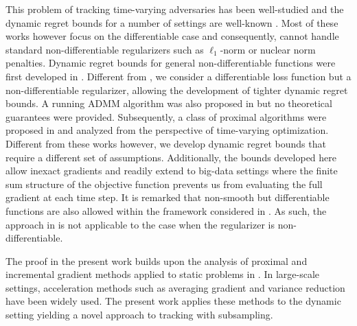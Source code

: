 \documentclass[draftcls,onecolumn,12pt]{IEEEtran}
\theoremstyle{plain}
\theoremstyle{plain}
\theoremstyle{remark}
\begin{document}
This problem of tracking time-varying adversaries has been well-studied and the dynamic regret bounds for a number of settings are well-known \cite{hall2015online, zhang2016improved, simonetto2015non, shahrampour2018distributed,pmlr-v38-jadbabaie15, bedi2018tracking}. Most of these works however focus on the differentiable case and consequently, cannot handle standard non-differentiable regularizers such as  $\ell_1$-norm or nuclear norm penalties. Dynamic regret bounds for general non-differentiable functions were first developed in \cite{hall2015online}. Different from \cite{hall2015online}, we consider a differentiable loss function but a non-differentiable regularizer, allowing the development of tighter dynamic regret bounds. A running ADMM algorithm was also proposed in \cite{simonetto2015non} but no theoretical guarantees were provided. Subsequently, a class of proximal algorithms were proposed in \cite{simonetto2017time, bernstein2018asynchronous} and analyzed from the perspective of time-varying optimization. Different from these works however, we develop dynamic regret bounds that require a different set of assumptions. Additionally, the bounds developed here allow inexact gradients and readily extend to big-data settings where the finite sum structure of the objective function prevents us from evaluating the full gradient at each time step. It is remarked that non-smooth but differentiable functions are also allowed within the framework considered in \cite{zhang2016improved}. As such, the approach in \cite{zhang2016improved} is not applicable to the case when the regularizer is non-differentiable. 

The proof in the present work builds upon the analysis of proximal and incremental gradient methods applied to static problems in \cite{bertsekas2000gradient}. In large-scale settings, acceleration methods such as averaging gradient \cite{defazio2014saga} and variance reduction \cite{xiao2014proximal} have been widely used. The present work applies these methods to the dynamic setting yielding a novel approach to tracking with subsampling. 



	
\end{document}
